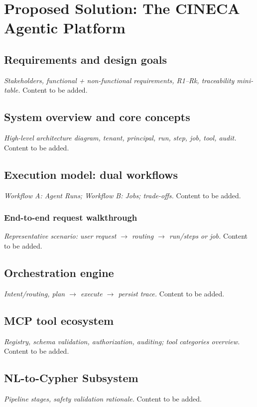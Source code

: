 \documentclass[a4paper,twoside]{sapthesis}
\begin{document}
\chapter{Proposed Solution: The CINECA Agentic Platform}
\label{ch:proposed-solution}

\section{Requirements and design goals}
\label{sec:requirements}
\emph{Stakeholders, functional + non-functional requirements, R1–Rk, traceability mini-table.} Content to be added.

\section{System overview and core concepts}
\label{sec:system-overview}
\emph{High-level architecture diagram, tenant, principal, run, step, job, tool, audit.} Content to be added.

\section{Execution model: dual workflows}
\label{sec:execution-model}
\emph{Workflow A: Agent Runs; Workflow B: Jobs; trade-offs.} Content to be added.

\subsection{End-to-end request walkthrough}
\label{sec:request-walkthrough}
\emph{Representative scenario: user request $\to$ routing $\to$ run/steps or job.} Content to be added.

\section{Orchestration engine}
\label{sec:orchestration-engine}
\emph{Intent/routing, plan $\to$ execute $\to$ persist trace.} Content to be added.

\section{MCP tool ecosystem}
\label{sec:mcp-tools}
\emph{Registry, schema validation, authorization, auditing; tool categories overview.} Content to be added.

\section{NL-to-Cypher Subsystem}
\label{sec:nl-cypher}
\emph{Pipeline stages, safety validation rationale.} Content to be added.
\end{document}
